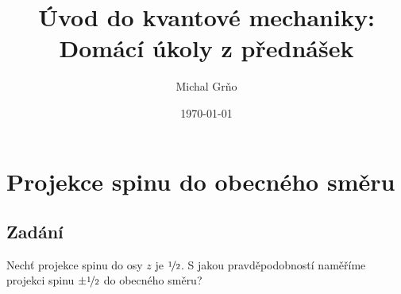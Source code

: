 \documentclass[10pt,a4paper]{article}
\begin{document}
\title{Úvod do kvantové mechaniky: Domácí úkoly z přednášek}
\author{Michal Grňo}
\date{\today}

\maketitle

\section{Projekce spinu do obecného směru}

\subsection{Zadání}
Nechť projekce spinu do osy $z$ je $\nicefrac{1}{2}$. S jakou pravděpodobností naměříme projekci spinu $\pm\nicefrac{1}{2}$ do obecného směru?
\end{document}
